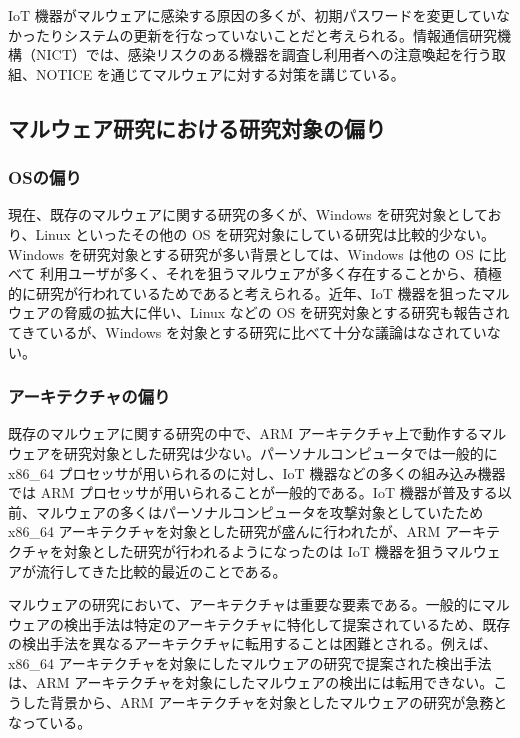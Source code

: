 \documentclass[12pt,a4paper,titlepage,report]{jsbook}
\begin{document}
IoT 機器がマルウェアに感染する原因の多くが、初期パスワードを変更していなかったりシステムの更新を行なっていないことだと考えられる。情報通信研究機構（NICT）では、感染リスクのある機器を調査し利用者への注意喚起を行う取組、NOTICE を通じてマルウェアに対する対策を講じている。


\subsection{マルウェア研究における研究対象の偏り}
\subsubsection{OSの偏り}
現在、既存のマルウェアに関する研究の多くが、Windows を研究対象としており、Linux といったその他の OS を研究対象にしている研究は比較的少ない\*。Windows を研究対象とする研究が多い背景としては、Windows は他の OS に比べて 利用ユーザが多く、それを狙うマルウェアが多く存在することから、積極的に研究が行われているためであると考えられる。近年、IoT 機器を狙ったマルウェアの脅威の拡大に伴い、Linux などの OS を研究対象とする研究も報告されてきているが、Windows を対象とする研究に比べて十分な議論はなされていない。

\subsubsection{アーキテクチャの偏り}
既存のマルウェアに関する研究の中で、ARM アーキテクチャ上で動作するマルウェアを研究対象とした研究は少ない。パーソナルコンピュータでは一般的に x86\_64 プロセッサが用いられるのに対し、IoT 機器などの多くの組み込み機器では ARM プロセッサが用いられることが一般的である\*。IoT 機器が普及する以前、マルウェアの多くはパーソナルコンピュータを攻撃対象としていたため x86\_64 アーキテクチャを対象とした研究が盛んに行われたが、ARM アーキテクチャを対象とした研究が行われるようになったのは IoT 機器を狙うマルウェアが流行してきた比較的最近のことである\*。

マルウェアの研究において、アーキテクチャは重要な要素である。一般的にマルウェアの検出手法は特定のアーキテクチャに特化して提案されているため、既存の検出手法を異なるアーキテクチャに転用することは困難とされる。例えば、x86\_64 アーキテクチャを対象にしたマルウェアの研究で提案された検出手法は、ARM アーキテクチャを対象にしたマルウェアの検出には転用できない。こうした背景から、ARM アーキテクチャを対象としたマルウェアの研究が急務となっている。
\end{document}
